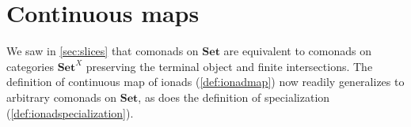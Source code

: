 \documentclass[11pt, oneside, article]{memoir}
\theoremstyle{plain}
\theoremstyle{definition}
\theoremstyle{remark}
\newenvironment{convention}
{\renewcommand\qedsymbol{$\lrcorner$}%
  \pushQED{\qed}\myconvention}
{\popQED\endmyconvention}
\newcommand{\namedcat}[1]{\mathbf{#1}}
\newcommand{\Set}{\namedcat{Set}}
\newcommand{\Cmd}{\mathbb{C}\namedcat{md}}
\newcommand{\CmdSet}{\Cmd}
\newcommand{\CmdId}{\Cmd_=}
\newcommand{\CmdIdSet}{\CmdId}
\newcommand{\Com}{\namedcat{Cmd}^\sharp}
\newcommand{\ComSet}{\Com}
\newcommand{\Con}{\namedcat{Cmd}^\natural}
\newcommand{\ConO}{\Con}
\newcommand{\ConOSet}{\ConO}
\newcommand{\AccCom}{\Com_{\mathrm{small}}}
\newcommand{\AccCon}{\Con_{\mathrm{small}}}
\newcommand{\AccComSet}{\AccCom}
\newcommand{\AccConO}{\AccCon}
\newcommand{\AccConOSet}{\AccConO}
\newcommand{\cmnd}[1]{{#1}}
\newcommand{\xA}{A}
\newcommand{\xX}{X}
\newcommand{\cC}{\cmnd{C}}
\begin{document}








\section{Continuous maps}\label{sec:continuousset}

We saw in \cref{sec:slices} that comonads on $\Set$ are equivalent to
comonads on categories $\Set^X$ preserving the terminal object and
finite intersections. The definition of continuous map of ionads
(\cref{def:ionadmap}) now readily generalizes to arbitrary comonads on
$\Set$, as does the definition of specialization
(\cref{def:ionadspecialization}).
\end{document}
